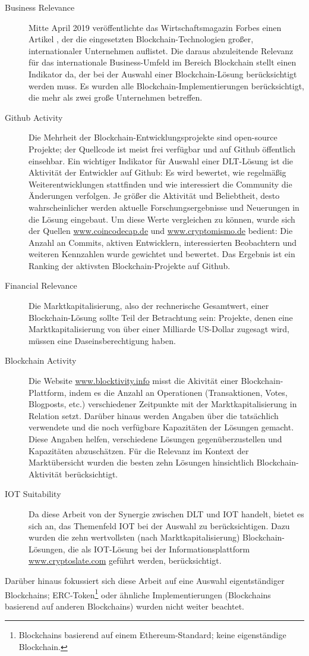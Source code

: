 \begin{description}
  \item[Business Relevance] Mitte April 2019 veröffentlichte das Wirtschaftsmagazin Forbes einen Artikel \cite{castillo2019}, der die eingesetzten Blockchain-Technologien großer, internationaler Unternehmen auflistet. Die daraus abzuleitende Relevanz für das internationale Business-Umfeld im Bereich Blockchain stellt einen Indikator da, der bei der Auswahl einer Blockchain-Lösung berücksichtigt werden muss. Es wurden alle Blockchain-Implementierungen berücksichtigt, die mehr als zwei große Unternehmen betreffen.
  \item[Github Activity] Die Mehrheit der Blockchain-Entwicklungsprojekte sind open-source Projekte; der Quellcode ist meist frei verfügbar und auf Github öffentlich einsehbar. Ein wichtiger Indikator für Auswahl einer \ac{DLT}-Lösung ist die Aktivität der Entwickler auf Github: Es wird bewertet, wie regelmäßig Weiterentwicklungen stattfinden und wie interessiert die Community die Änderungen verfolgen. Je größer die Aktivität und Beliebtheit, desto wahrscheinlicher werden aktuelle Forschungsergebnisse und Neuerungen in die Lösung eingebaut. Um diese Werte vergleichen zu können, wurde sich der Quellen \url{www.coincodecap.de} und \url{www.cryptomismo.de} bedient: Die Anzahl an Commits, aktiven Entwicklern, interessierten Beobachtern und weiteren Kennzahlen wurde gewichtet und bewertet. Das Ergebnis ist ein Ranking der aktivsten Blockchain-Projekte auf Github.
  \item[Financial Relevance] Die Marktkapitalisierung, also der rechnerische Gesamtwert, einer Blockchain-Lösung sollte Teil der Betrachtung sein: Projekte, denen eine Marktkapitalisierung von über einer Milliarde US-Dollar zugesagt wird, müssen eine Daseinsberechtigung haben.
  \item[Blockchain Activity] Die Website \url{www.blocktivity.info} misst die Akivität einer Blockchain-Plattform, indem es die Anzahl an Operationen (Transaktionen, Votes, Blogposts, etc.) verschiedener Zeitpunkte mit der Marktkapitalisierung in Relation setzt. Darüber hinaus werden Angaben über die tatsächlich verwendete und die noch verfügbare Kapazitäten der Lösungen gemacht. Diese Angaben helfen, verschiedene Lösungen gegenüberzustellen und Kapazitäten abzuschätzen. Für die Relevanz im Kontext der Marktübersicht wurden die besten zehn Lösungen hinsichtlich Blockchain-Aktivität berücksichtigt.
  \item[IOT Suitability] Da diese Arbeit von der Synergie zwischen \ac{DLT} und \ac{IOT} handelt, bietet es sich an, das Themenfeld \ac{IOT} bei der Auswahl zu berücksichtigen. Dazu wurden die zehn wertvollsten (nach Marktkapitalisierung) Blockchain-Lösungen, die als \ac{IOT}-Lösung bei der Informationsplattform \url{www.cryptoslate.com} geführt werden, berücksichtigt.
\end{description}
Darüber hinaus fokussiert sich diese Arbeit auf eine Auswahl eigentständiger Blockchains; ERC-Token\footnote{Blockchains basierend auf einem Ethereum-Standard; keine eigenständige Blockchain.} oder ähnliche Implementierungen (Blockchains basierend auf anderen Blockchains) wurden nicht weiter beachtet.
%
%
